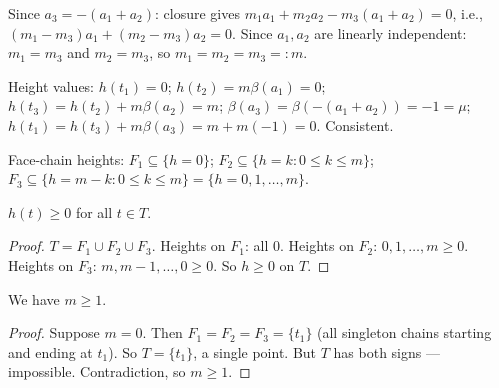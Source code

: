 Since $a_3 = -(a_1+a_2)$: closure gives $m_1 a_1 + m_2 a_2 - m_3(a_1+a_2) = 0$, i.e., $(m_1-m_3)a_1 + (m_2-m_3)a_2 = 0$. Since $a_1,a_2$ are linearly independent: $m_1 = m_3$ and $m_2 = m_3$, so $m_1 = m_2 = m_3 =: m$.

Height values: $h(t_1)=0$; $h(t_2) = m\beta(a_1) = 0$; $h(t_3) = h(t_2) + m\beta(a_2) = m$; $\beta(a_3) = \beta(-(a_1+a_2)) = -1 = \mu$; $h(t_1) = h(t_3) + m\beta(a_3) = m + m(-1) = 0$. Consistent.

Face-chain heights: $F_1 \subseteq \{h=0\}$; $F_2 \subseteq \{h = k : 0 \leq k \leq m\}$; $F_3 \subseteq \{h = m - k : 0 \leq k \leq m\} = \{h = 0,1,\ldots,m\}$.

\begin{lemma}[betamin3]\label{lem:betamin3}
$h(t) \geq 0$ for all $t \in T$.
\end{lemma}
\begin{proof}
$T = F_1 \cup F_2 \cup F_3$. Heights on $F_1$: all $0$. Heights on $F_2$: $0,1,\ldots,m \geq 0$. Heights on $F_3$: $m, m-1,\ldots,0 \geq 0$. So $h \geq 0$ on $T$.
\end{proof}

\begin{lemma}[n3m: $m \geq 1$]\label{lem:n3m}
We have $m \geq 1$.
\end{lemma}
\begin{proof}
Suppose $m = 0$. Then $F_1 = F_2 = F_3 = \{t_1\}$ (all singleton chains starting and ending at $t_1$). So $T = \{t_1\}$, a single point. But $T$ has both signs — impossible. Contradiction, so $m \geq 1$.
\end{proof}

